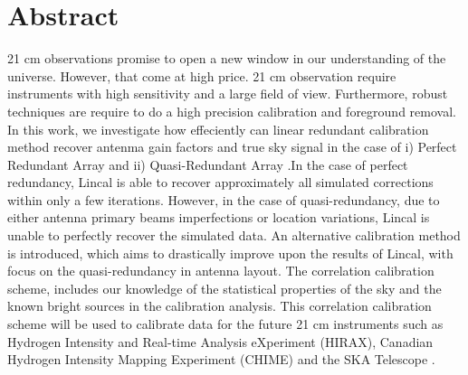 \chapter*{Abstract}

\noindent

21 cm observations promise to open a new window in our understanding of the universe. However, that come at high price. 21 cm observation require instruments with high sensitivity and a large field of view. Furthermore, robust techniques are require to do a high precision calibration and  foreground removal. In this work, we investigate how effeciently can linear redundant calibration method recover antenma gain factors and true sky signal in the case of  i) Perfect Redundant Array and ii) Quasi-Redundant Array .In the case of perfect redundancy, Lincal is able to recover approximately all simulated corrections within only a few iterations. However, in the case of quasi-redundancy, due to either antenna primary beams imperfections or location variations, Lincal is unable to perfectly recover the simulated data. An alternative calibration method is introduced, which aims to drastically improve upon the results of Lincal, with focus on the quasi-redundancy in antenna layout. The correlation calibration scheme, includes our knowledge of the statistical properties of the sky and the known bright sources in the calibration analysis. This correlation calibration scheme will be used to calibrate data for the future 21 cm instruments such as Hydrogen Intensity and Real-time Analysis eXperiment (HIRAX), Canadian Hydrogen Intensity Mapping Experiment (CHIME) and the  SKA Telescope .\\

